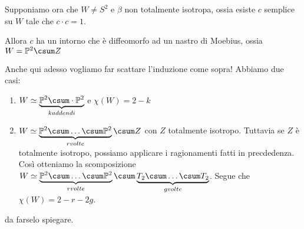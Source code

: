 Supponiamo ora che $W\neq S^2$ e $\beta$ non totalmente isotropa, ossia esiste $c$ semplice su $W$ tale che $c\cdot c = 1$.
\begin{oss}
 Allora $c$ ha un intorno che è diffeomorfo ad un nastro di Moebius, ossia $W=\mathbb P ^2 \csum Z$
\end{oss}
Anche qui adesso vogliamo far scattare l'induzione come sopra! Abbiamo due casi:
\begin{enumerate}
 \item $W\simeq \underbrace {\mathbb P^2\csum \cdot \mathbb P^2}_{k addendi}$ e $\chi (W) = 2 - k$
 \item $W\simeq\underbrace{\mathbb P^2\csum \dots \csum \mathbb P^2}_{r volte}\csum Z$ con $Z$ totalmente isotropo.
 Tuttavia se $Z$ è totalmente isotropo, possiamo applicare i ragionamenti fatti in precdedenza. Così otteniamo la scomposizione
 $W \simeq \underbrace{\mathbb P^2\csum \dots \csum \mathbb P^2}_{r volte}\csum \underbrace{T_2\csum \dots \csum T_2}_{g volte}$.
 Segue che $\chi(W) = 2-r-2g$.
\end{enumerate}
\begin{lemma}
 da farselo spiegare.
\end{lemma}



